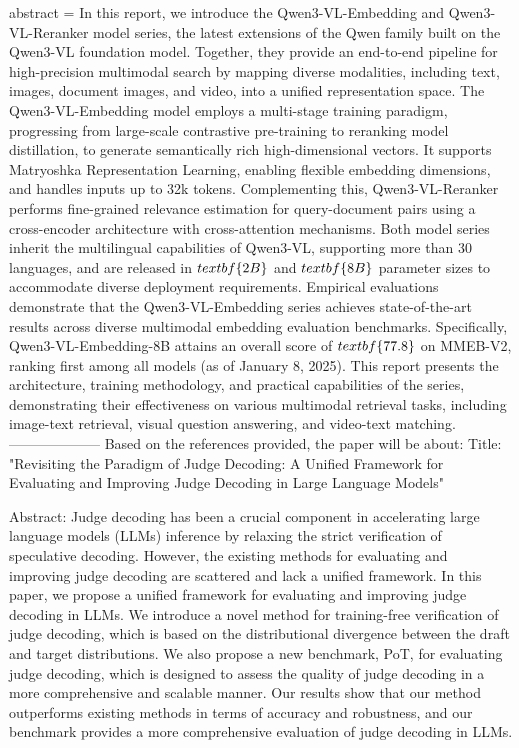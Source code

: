 {      abstract = {In this report, we introduce the Qwen3-VL-Embedding and Qwen3-VL-Reranker model series, the latest extensions of the Qwen family built on the Qwen3-VL foundation model. Together, they provide an end-to-end pipeline for high-precision multimodal search by mapping diverse modalities, including text, images, document images, and video, into a unified representation space. The Qwen3-VL-Embedding model employs a multi-stage training paradigm, progressing from large-scale contrastive pre-training to reranking model distillation, to generate semantically rich high-dimensional vectors. It supports Matryoshka Representation Learning, enabling flexible embedding dimensions, and handles inputs up to 32k tokens. Complementing this, Qwen3-VL-Reranker performs fine-grained relevance estimation for query-document pairs using a cross-encoder architecture with cross-attention mechanisms. Both model series inherit the multilingual capabilities of Qwen3-VL, supporting more than 30 languages, and are released in $\\textbf\{2B\}$ and $\\textbf\{8B\}$ parameter sizes to accommodate diverse deployment requirements. Empirical evaluations demonstrate that the Qwen3-VL-Embedding series achieves state-of-the-art results across diverse multimodal embedding evaluation benchmarks. Specifically, Qwen3-VL-Embedding-8B attains an overall score of $\\textbf\{77.8\}$ on MMEB-V2, ranking first among all models (as of January 8, 2025). This report presents the architecture, training methodology, and practical capabilities of the series, demonstrating their effectiveness on various multimodal retrieval tasks, including image-text retrieval, visual question answering, and video-text matching.}
}
        --------------------
         Based on the references provided, the paper will be about:
Title: "Revisiting the Paradigm of Judge Decoding: A Unified Framework for Evaluating and Improving Judge Decoding in Large Language Models"

Abstract: 
Judge decoding has been a crucial component in accelerating large language models (LLMs) inference by relaxing the strict verification of speculative decoding. However, the existing methods for evaluating and improving judge decoding are scattered and lack a unified framework. In this paper, we propose a unified framework for evaluating and improving judge decoding in LLMs. We introduce a novel method for training-free verification of judge decoding, which is based on the distributional divergence between the draft and target distributions. We also propose a new benchmark, PoT, for evaluating judge decoding, which is designed to assess the quality of judge decoding in a more comprehensive and scalable manner. Our results show that our method outperforms existing methods in terms of accuracy and robustness, and our benchmark provides a more comprehensive evaluation of judge decoding in LLMs.

